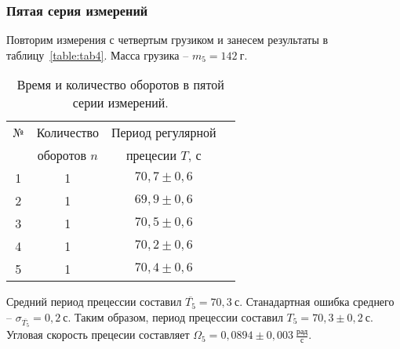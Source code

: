 \documentclass[a4paper,11pt]{article}
\begin{document}
\subsubsection{Пятая серия измерений} %
Повторим измерения с четвертым грузиком и занесем результаты в таблицу~\ref{table:tab4}.\newline
Масса грузика -- $m_{5} = 142\ г$.
\begin{table}[h!]
\centering
\begin{tabular}{ ||c|c|c|c|| }
  \hline
  № & Количество & Период регулярной \\
   & оборотов $n$  & прецесии $T$, $с$ \\
  \hline
  1 & 1 & $70,7 \pm 0,6$ \\
  2 & 1 & $69,9 \pm 0,6$ \\
  3 & 1 & $70,5 \pm 0,6$ \\
  4 & 1 & $70,2 \pm 0,6$ \\
  5 & 1 & $70,4 \pm 0,6$ \\
  \hline
\end{tabular}
\caption{Время и количество оборотов в пятой серии измерений.}
\label{table:tab5}
\end{table}\newline
Средний период прецессии составил $\overline{T_{5}} = 70,3\ с$.\newline
Станадартная ошибка среднего -- $\sigma_{\overline{T_{5}}}= 0,2\ с$.\newline
Таким образом, период прецессии составил $T_{5} = 70,3 \pm 0,2\ с$.\newline
Угловая скорость прецесии составляет $\Omega_{5} = 0,0894 \pm 0,003\ \frac{рад}{с}$.
\end{document}
